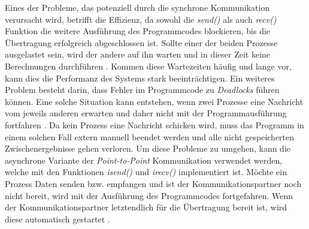 Eines der Probleme, das potenziell durch die synchrone Kommunikation verursacht wird, betrifft die Effizienz, da sowohl die \emph{send()} als auch \emph{recv()} Funktion die weitere Ausführung des Programmcodes blockieren, bis die Übertragung erfolgreich abgeschlossen ist. Sollte einer der beiden Prozesse ausgelastet sein, wird der andere auf ihn warten und in dieser Zeit keine Berechnungen durchführen \cite{nielsen2016introduction}. Kommen diese Wartezeiten häufig und lange vor, kann dies die Performanz des Systems stark beeinträchtigen. Ein weiteres Problem besteht darin, dass Fehler im Programmcode zu \emph{Deadlocks} führen können. Eine solche Situation kann entstehen, wenn zwei Prozesse eine Nachricht vom jeweils anderen erwarten und daher nicht mit der Programmausführung fortfahren \cite{nielsen2016introduction}. Da kein Prozess eine Nachricht schicken wird, muss das Programm in einem solchen Fall extern manuell beendet werden und alle nicht gespeicherten Zwischenergebnisse gehen verloren. Um diese Probleme zu umgehen, kann die asynchrone Variante der \emph{Point-to-Point} Kommunikation verwendet werden, welche mit den Funktionen \emph{isend()} und \emph{irecv()} implementiert ist. Möchte ein Prozess Daten senden bzw. empfangen und ist der Kommunikationspartner noch nicht bereit, wird mit der Ausführung des Programmcodes fortgefahren. Wenn der Kommunikationspartner letztendlich für die Übertragung bereit ist, wird diese automatisch gestartet \cite{nielsen2016introduction}. 

